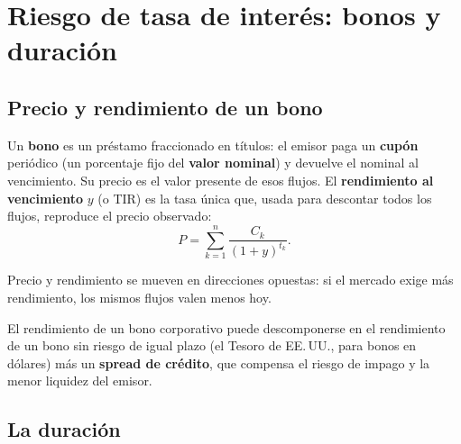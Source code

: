 \section{Riesgo de tasa de interés: bonos y duración}

\subsection{Precio y rendimiento de un bono}

\begin{definicion}
Un \textbf{bono} es un préstamo fraccionado en títulos: el emisor paga un \textbf{cupón} periódico (un porcentaje fijo del \textbf{valor nominal}) y devuelve el nominal al vencimiento. Su precio es el valor presente de esos flujos. El \textbf{rendimiento al vencimiento} $y$ (o TIR) es la tasa única que, usada para descontar todos los flujos, reproduce el precio observado:
\[ P=\sum_{k=1}^{n}\frac{C_k}{(1+y)^{t_k}}. \]
\end{definicion}

Precio y rendimiento se mueven en direcciones opuestas: si el mercado exige más rendimiento, los mismos flujos valen menos hoy.

\begin{definicion}
El rendimiento de un bono corporativo puede descomponerse en el rendimiento de un bono sin riesgo de igual plazo (el Tesoro de EE.\,UU., para bonos en dólares) más un \textbf{spread de crédito}, que compensa el riesgo de impago y la menor liquidez del emisor.
\end{definicion}

\subsection{La duración}

